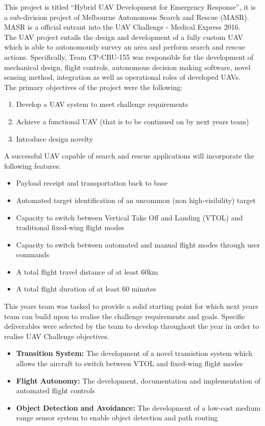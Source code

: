 This project is titled ``Hybrid UAV Development for Emergency Response'', it is a sub-division project of Melbourne Autonomous Search and Rescue (MASR). MASR is a official entrant into the UAV  Challenge - Medical Express 2016.\\

The UAV project entails the design and development of a fully custom UAV which is able to autonomously survey an area and perform search and rescue actions. Specifically, Team CP-CBU-155 was responsible for the development of mechanical design, flight controls, autonomous decision making software, novel sensing method, integration as well as operational roles of developed UAVs.\\

The primary objectives of the project were the following:

\begin{enumerate}
	\item Develop a UAV system to meet challenge requirements
	\item Achieve a functional UAV (that is to be continued on by next years team)
	\item Introduce design novelty \\
\end{enumerate}

A successful UAV capable of search and rescue applications will incorporate the following features:
\begin{itemize}
	\item Payload receipt and transportation back to base
	\item Automated target identification of an uncommon (non high-visibility) target
	\item Capacity to switch between Vertical Take Off and Landing (VTOL) and traditional fixed-wing flight modes
	\item Capacity to switch between automated and manual flight modes through user commands
	\item A total flight travel distance of at least 60km
	\item A total flight duration of at least 60 minutes\\
\end{itemize}

This years team was tasked to provide a solid starting point for which next years team can build upon to realise the challenge requirements and goals. Specific deliverables were selected by the team to develop throughout the year in order to realise UAV Challenge objectives.
\begin{itemize}
	\item \textbf{Transition System:} The development of a novel transistion system which allows the aircraft to switch between VTOL and fixed-wing flight modes
	\item \textbf{Flight Autonomy:} The development, documentation and implementation of automated flight controls
	\item \textbf{Object Detection and Avoidance:} The development of a low-cost medium range sensor system to enable object detection and path routing
\end{itemize}

